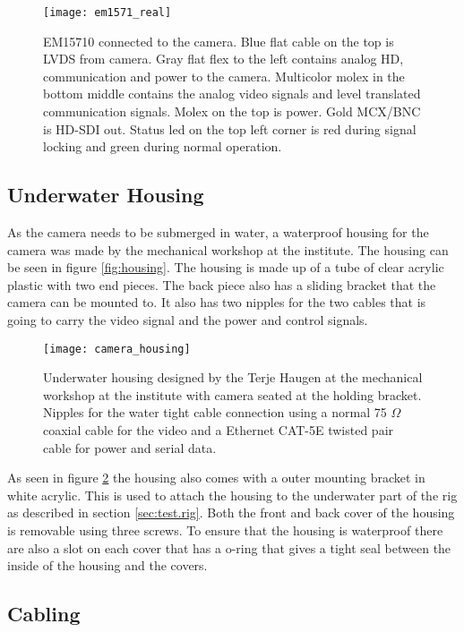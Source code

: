 \begin{figure}
 	\centering
 	\texttt{[image: em1571\_real]}
 	\caption{EM15710 connected to the camera. Blue flat cable on the top is LVDS from camera. Gray flat flex to the left contains 
 		analog HD, communication and power to the camera. Multicolor molex in the bottom middle contains the analog video signals and level translated communication signals. Molex on the top is power. Gold MCX/BNC is HD-SDI out. Status led on the top left corner is red during signal locking and green during normal operation.}
 	\label{fig:hd-sdi.card}
\end{figure}

\subsection{Underwater Housing}
As the camera needs to be submerged in water, a waterproof housing for the camera was made by the mechanical workshop at the institute. The housing can 
be seen in figure \vref{fig:housing}. The housing is made up of a tube of clear acrylic plastic with two end pieces. The back piece also
has a sliding bracket that the camera can be mounted to. It also has two nipples for the two cables that is going to carry the video signal and 
the power and control signals. 

\begin{figure}
 	\centering
 	\texttt{[image: camera\_housing]}
 	\caption{Underwater housing designed by the Terje Haugen at the mechanical workshop at the institute with camera seated at the holding bracket. Nipples for the 
 		water tight cable connection using a normal 75 $\Omega$ coaxial cable for the video and a Ethernet CAT-5E twisted pair cable for power and serial data.}
 	\label{fig:housing}
\end{figure}

As seen in figure \ref{fig:housing} the housing also comes with a outer mounting bracket in white acrylic. This is used to attach the housing to the underwater 
part of the rig as described in section \vref{sec:test.rig}. Both the front and back cover of the housing is removable using three screws. To ensure that 
the housing is waterproof there are also a slot on each cover that has a o-ring that gives a tight seal between the inside of the housing and the covers.

\subsection{Cabling}

